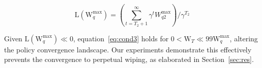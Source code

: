 \begin{equation}
\text{L}(\text{W}_q^{\text{max}}) = (\sum_{t={T_2+1}}^{\infty} \gamma^t W_{q2}^{\text{max}})/ \gamma^{T_2}
\label{eq:reward1}
\end{equation}



Given $\text{L}(\text{W}_q^{\text{max}}) \ll 0$, equation~\ref{eq:cond3} holds for $0 < \text{W}_T \ll 99\text{W}_q^{\text{max}}$, altering the policy convergence landscape. Our experiments demonstrate this effectively prevents the convergence to perpetual wiping, as elaborated in Section~\ref{sec:res}.





































\
